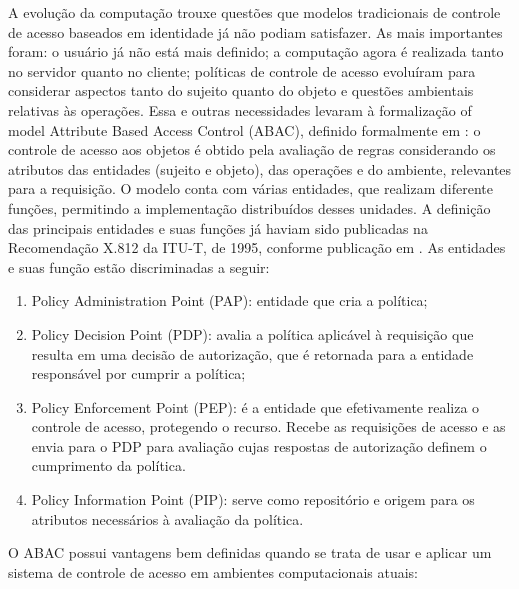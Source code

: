 \documentclass{doublecol-new}
\begin{document}
A evolução da computação trouxe questões que modelos tradicionais de controle de acesso baseados em identidade já não podiam satisfazer. As mais importantes foram: o usuário já não está mais definido; a computação agora é realizada tanto no servidor quanto no cliente; políticas de controle de acesso evoluíram para considerar aspectos tanto do sujeito quanto do objeto e questões ambientais relativas às operações. Essa e outras necessidades levaram à formalização of model Attribute Based Access Control (ABAC), definido formalmente em \cite{huABAC2014guide}: o controle de acesso aos objetos é obtido pela avaliação de regras considerando os atributos das entidades (sujeito e objeto), das operações e do ambiente, relevantes para a requisição. O modelo conta com várias entidades, que realizam diferente funções, permitindo a implementação distribuídos desses unidades. A definição das principais entidades e suas funções já haviam sido publicadas na Recomendação X.812 da ITU-T, de 1995, conforme publicação em \cite{itut1996acframework}. As entidades e suas função estão discriminadas a seguir:

\begin{enumerate}
	\item Policy Administration Point (PAP): entidade que cria a política;
	\item Policy Decision Point (PDP): avalia a política aplicável à requisição que resulta em uma decisão de autorização, que é retornada para a entidade responsável por cumprir a política;
	\item Policy Enforcement Point (PEP): é a entidade que efetivamente realiza o controle de acesso, protegendo o recurso. Recebe as requisições de acesso e as envia para o PDP para avaliação cujas respostas de autorização definem o cumprimento da política.
	\item Policy Information Point (PIP): serve como repositório e origem para os atributos necessários à avaliação da política.
\end{enumerate}

O ABAC possui vantagens bem definidas quando se trata de usar e aplicar um sistema de controle de acesso em ambientes computacionais atuais: 
\end{document}
